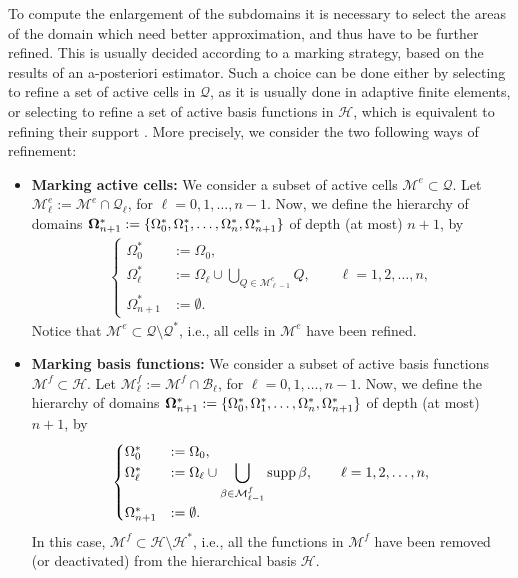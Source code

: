 \documentclass[a4paper]{siamltex1213}
\newcommand{\D}{\displaystyle}
\newcommand\BB{\mathcal B}
\newcommand\MM{\mathcal M}
\newcommand\QQ{\mathcal Q}
\newcommand\HH{\mathcal H}
\begin{document}
To compute the enlargement of the subdomains it is necessary to select the areas of the domain which need better approximation, and thus have to be further refined. This is usually decided according to a marking strategy, based on the results of an a-posteriori estimator. Such a choice can be done either by selecting to refine a set of active cells in $\QQ$, as it is usually done in adaptive finite elements, or selecting to refine a set of active basis functions in $\HH$, which is equivalent to refining their support \cite{BG15b}. More precisely, we consider the two following ways of refinement:
\begin{itemize}
\item {\bf Marking active cells:} We consider a subset of active cells $\MM^e\subset\QQ$. Let $\MM^e_\ell:=\MM^e\cap\QQ_\ell$, for $\ell = 0,1,\dots,n-1$. Now, we define the hierarchy of domains ${\bf\Omega}^*_{n+1} := 
\{\Omega_0^*,\Omega_1^*,\dots,\Omega_n^*,\Omega_{n+1}^*\}$ of depth (at most) 
$n+1$, by
\begin{align}\label{E:marking active cells}
\begin{cases}\Omega_0^* &:=\Omega_0,\\
\Omega_{\ell}^* &:=\Omega_{\ell}\cup \D\bigcup_{Q\in\MM^e_{\ell-1}}Q,\qquad \ell = 1,2,\dots,n,\\
\Omega_{n+1}^*&:= \emptyset.
\end{cases}
\end{align}
Notice that $\MM^e\subset\QQ\setminus\QQ^*$, i.e., all cells in $\MM^e$ have been refined.
 \item {\bf Marking basis functions:} We consider a subset of active basis functions $\MM^f\subset\HH$. Let $\MM^f_\ell:=\MM^f\cap\BB_\ell$, for $\ell = 0,1,\dots,n-1$. Now, we define the hierarchy of domains ${\bf\Omega}^*_{n+1} := 
\{\Omega_0^*,\Omega_1^*,\dots,\Omega_n^*,\Omega_{n+1}^*\}$ of depth (at most) 
$n+1$, by
\begin{align}\label{E:marking basis functions}
\begin{cases}\Omega_0^* &:=\Omega_0,\\
\Omega_{\ell}^* &:=\Omega_{\ell}\cup \D\bigcup_{\beta\in\MM^f_{\ell-1}}\supp 
\beta,\qquad \ell = 1,2,\dots,n,\\
\Omega_{n+1}^*&:= \emptyset.
\end{cases}
\end{align}
In this case, $\MM^f\subset\HH\setminus\HH^*$, i.e., all the functions in $\MM^f$ have been removed (or deactivated) from the hierarchical basis $\HH$. 
\end{itemize}
\end{document}
